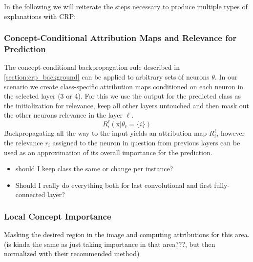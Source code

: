 In the following we will reiterate the steps necessary to produce multiple types of explanations with CRP:

\subsubsection{Concept-Conditional Attribution Maps and Relevance for Prediction}
The concept-conditional backpropagation rule described in \cref{section:crp_background} can be applied to arbitrary sets of neurons $\theta$. In our scenario we create class-specific attribution maps conditioned on each neuron in the selected layer (3 or 4). For this we use the output for the predicted class as the initialization for relevance, keep all other layers untouched and then mask out the other neurons relevance in the layer $\ell$. 
\begin{equation}
    R_{i}^{\ell}(\mathrm{x} |\theta_{\ell}=\{i\}) 
\end{equation}
Backpropagating all the way to the input yields an attribution map $R_i^{\ell}$, however the relevance $r_i$ assigned to the neuron in question from previous layers can be used as an approximation of its overall importance for the prediction.

\begin{itemize}
    \item should I keep class the same or change per instance?
    \item Should I really do everything both for last convolutional and first fully-connected layer?
\end{itemize}

\subsubsection{Local Concept Importance}
Masking the desired region in the image and computing attributions for this area. (is kinda the same as just taking importance in that area???, but then normalized with their recommended method)


